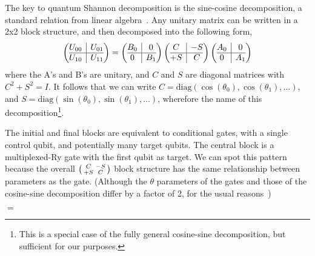 The key to quantum Shannon decomposition is the sine-cosine decomposition, a standard relation from linear algebra~\cite{???}. Any unitary matrix can be written in a 2x2 block structure, and then decomposed into the following form, 
\[
\left(\begin{array}{@{}c|c@{}}
  U_{00}
  & U_{01} \\
\hline
  U_{10} &
  U_{11}   
\end{array}\right)
=
\left(\begin{array}{@{}c|c@{}}
B_0
  & 0 \\
\hline
  0 &
B_1
\end{array}\right)
\left(\begin{array}{@{}c|c@{}}
C
  & -S \\
\hline
  +S &
C
\end{array}\right)
\left(\begin{array}{@{}c|c@{}}
A_0
  & 0 \\
\hline
  0 &
A_1
\end{array}\right)
\]
where the A's and B's are unitary, and $C$ and $S$ are diagonal matrices with $C^2+S^2=I$. It follows that we can write $C=\text{diag}(\cos(\theta_0), \cos(\theta_1), \ldots)$, and $S=\text{diag}(\sin(\theta_0), \sin(\theta_1), \ldots)$, wherefore the name of this decomposition\footnote{This is a special case of the fully general cosine-sine decomposition, but sufficient for our purposes.}. 

The initial and final blocks are equivalent to conditional gates, with a single control qubit, and potentially many target qubits. The central block is a multiplexed-Ry gate with the first qubit as target. We can spot this pattern because the overall $\begin{psmallmatrix}C & -S\\ +S & C\end{psmallmatrix}$ block structure has the same relationship between parameters as the  gate. (Although the $\theta$ parameters of the  gates and those of the cosine-sine decomposition differ by a factor of 2, for the usual reasons~\cite{???})



\begin{center}
$ = $
\end{center}



